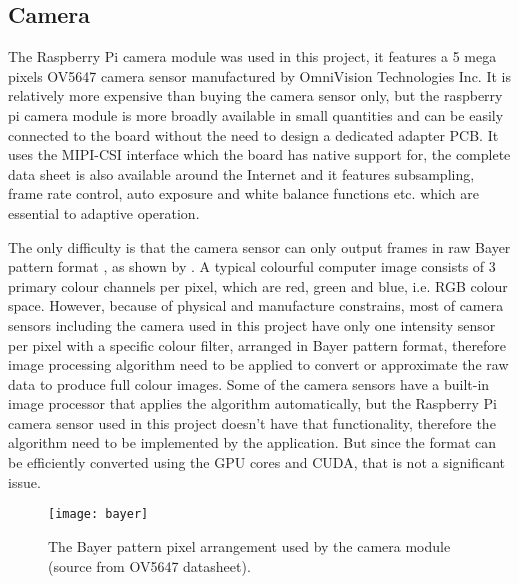 \subsection{Camera}


The Raspberry Pi camera module was used in this project, it features a 5 mega pixels OV5647 camera sensor manufactured by OmniVision Technologies Inc. It is relatively more expensive than buying the camera sensor only, but the raspberry pi camera module is more broadly available in small quantities and can be easily connected to the board without the need to design a dedicated adapter PCB. It uses the MIPI-CSI interface which the board has native support for, the complete data sheet is also available around the Internet and it features subsampling, frame rate control, auto exposure and white balance functions etc. which are essential to adaptive operation.

The only difficulty is that the camera sensor can only output frames in raw Bayer pattern format \cite{bayer1976color}, as shown by . A typical colourful computer image consists of 3 primary colour channels per pixel, which are red, green and blue, i.e. RGB colour space. However, because of physical and manufacture constrains, most of camera sensors including the camera used in this project have only one intensity sensor per pixel with a specific colour filter, arranged in Bayer pattern format, therefore image processing algorithm need to be applied to convert or approximate the raw data to produce full colour images. Some of the camera sensors have a built-in image processor that applies the algorithm automatically, but the Raspberry Pi camera sensor used in this project doesn't have that functionality, therefore the algorithm need to be implemented by the application. But since the format can be efficiently converted using the GPU cores and CUDA, that is not a significant issue.

\begin{figure}[H]
  \centering
  \texttt{[image: bayer]}
  \caption{The Bayer pattern pixel arrangement used by the camera module (source from OV5647 datasheet).}
  \label{bayer}
\end{figure}

